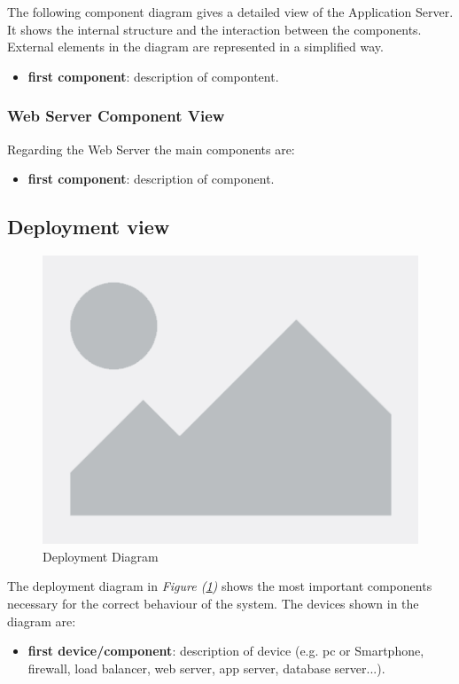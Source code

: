 \documentclass[table, 12pt]{article}
\begin{document}
The following component diagram gives a detailed view of the Application Server. It shows the internal structure and the interaction between the components.
External elements in the diagram are represented in a simplified way.

\begin{itemize}
    \item \textbf{first component}: description of compontent.
\end{itemize}

\subsubsection*{Web Server Component View}
Regarding the Web Server the main components are:
\begin{itemize}
    \item \textbf{first component}: description of component.
\end{itemize}

\newpage

\subsection{Deployment view}
\begin{center}
    \begin{figure}[H]
        \includegraphics[scale=0.45, center]{assets/placeholder.png}
        \caption{Deployment Diagram}
        \label{fig: deployment_diagram}
    \end{figure}
\end{center}

The deployment diagram in \textit{Figure (\ref{fig: deployment_diagram})} shows the most important components necessary for the correct behaviour of the system.
The devices shown in the diagram are:
\begin{itemize}
    \item \textbf{first device/component}: description of device (e.g. pc or Smartphone, firewall, load balancer, web server, app server, database server...).
\end{itemize}
\newpage
\end{document}
